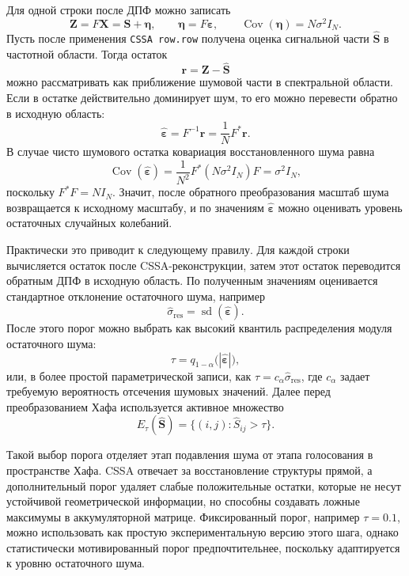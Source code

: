 Для одной строки после ДПФ можно записать
\[
\mathbf{Z}
=
F\mathbf{X}
=
\mathbf{S}+\boldsymbol{\eta},
\qquad
\boldsymbol{\eta}=F\boldsymbol{\varepsilon},
\qquad
\operatorname{Cov}(\boldsymbol{\eta})=N\sigma^2 I_N.
\]
Пусть после применения \texttt{CSSA row.row} получена оценка сигнальной части $\widehat{\mathbf{S}}$ в частотной области. Тогда остаток
\[
\mathbf{r}=\mathbf{Z}-\widehat{\mathbf{S}}
\]
можно рассматривать как приближение шумовой части в спектральной области. Если в остатке действительно доминирует шум, то его можно перевести обратно в исходную область:
\[
\widehat{\boldsymbol{\varepsilon}}
=
F^{-1}\mathbf{r}
=
\frac{1}{N}F^{*}\mathbf{r}.
\]
В случае чисто шумового остатка ковариация восстановленного шума равна
\[
\operatorname{Cov}(\widehat{\boldsymbol{\varepsilon}})
=
\frac{1}{N^2}F^{*}(N\sigma^2 I_N)F
=
\sigma^2 I_N,
\]
поскольку $F^{*}F=N I_N$. Значит, после обратного преобразования масштаб шума возвращается к исходному масштабу, и по значениям $\widehat{\boldsymbol{\varepsilon}}$ можно оценивать уровень остаточных случайных колебаний.

Практически это приводит к следующему правилу. Для каждой строки вычисляется остаток после CSSA-реконструкции, затем этот остаток переводится обратным ДПФ в исходную область. По полученным значениям оценивается стандартное отклонение остаточного шума, например
\[
\widehat{\sigma}_{\mathrm{res}}
=
\operatorname{sd}(\widehat{\boldsymbol{\varepsilon}}).
\]
После этого порог можно выбрать как высокий квантиль распределения модуля остаточного шума:
\[
\tau
=
q_{1-\alpha}\bigl(|\widehat{\boldsymbol{\varepsilon}}|\bigr),
\]
или, в более простой параметрической записи, как $\tau=c_{\alpha}\widehat{\sigma}_{\mathrm{res}}$, где $c_{\alpha}$ задает требуемую вероятность отсечения шумовых значений. Далее перед преобразованием Хафа используется активное множество
\[
E_{\tau}(\widehat{\mathbf{S}})
=
\{(i,j)\colon \widehat{S}_{ij}>\tau\}.
\]

Такой выбор порога отделяет этап подавления шума от этапа голосования в пространстве Хафа. CSSA отвечает за восстановление структуры прямой, а дополнительный порог удаляет слабые положительные остатки, которые не несут устойчивой геометрической информации, но способны создавать ложные максимумы в аккумуляторной матрице. Фиксированный порог, например $\tau=0.1$, можно использовать как простую экспериментальную версию этого шага, однако статистически мотивированный порог предпочтительнее, поскольку адаптируется к уровню остаточного шума.
